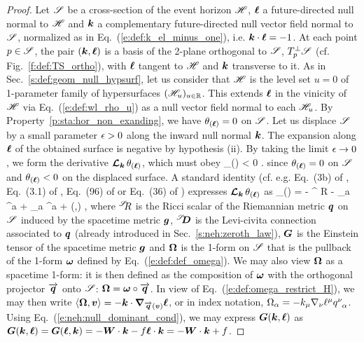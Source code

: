 \begin{proof}
Let $\mathscr{S}$ be a cross-section of the event horizon $\mathscr{H}$,
$\bm{\ell}$ a future-directed null normal to $\mathscr{H}$ and $\bm{k}$ a complementary
future-directed null vector field
normal to $\mathscr{S}$, normalized as in Eq.~(\ref{e:def:k_el_minus_one}), i.e.
$\bm{k}\cdot\bm{\ell} = -1$. At each point $p\in \mathscr{S}$, the pair $(\bm{k},\bm{\ell})$ is
a basis of the 2-plane orthogonal to $\mathscr{S}$, $T_p^\perp\mathscr{S}$ (cf. Fig.~\ref{f:def:TS_ortho}),
with $\bm{\ell}$ tangent to $\mathscr{H}$ and $\bm{k}$ transverse to it.
As in Sec.~\ref{s:def:geom_null_hypsurf}, let us consider that $\mathscr{H}$
is the level set $u=0$ of 1-parameter family of hypersurfaces $(\mathscr{H}_u)_{u\in\mathbb{R}}$.
This extends $\bm{\ell}$ in the vinicity of $\mathscr{H}$ via Eq.~(\ref{e:def:wl_rho_u})
as a null vector field normal to each $\mathscr{H}_u$.
By Property~\ref{p:sta:hor_non_exanding}, we have $\theta_{(\bm{\ell})} = 0$
on $\mathscr{S}$. Let us displace $\mathscr{S}$ by a small parameter $\epsilon>0$ along the inward
null normal $\bm{k}$. The expansion along $\bm{\ell}$ of the obtained surface is
negative by hypothesis (ii). By taking the limit $\epsilon\to 0$, we form the
derivative $\bm{\mathcal{L}}_{\bm{\bm{k}}}\, \theta_{(\bm{\ell})}$, which must obey
\be \label{e:sta:Lie_k_l}
     \theta_{(\wl)} < 0 .
\ee
since $\theta_{(\bm{\ell})} = 0$ on $\mathscr{S}$ and
$\theta_{(\bm{\ell})} < 0$ on the displaced surface.
A standard identity (cf. e.g. Eq.~(3b) of \cite{Haywa94}, Eq.~(3.1) of \cite{BoothF07},
Eq.~(96) of \cite{Cao11} or Eq.~(36) of \cite{Jaram13})
expresses $\bm{\mathcal{L}}_{\bm{\bm{k}}}\,\theta_{(\bm{\ell})}$ as
\be \label{e:sta:Lie_k_theta_l}
     \theta_{(\wl)} = -  {}^\Sp\!\! R - \DSc_a \Omega^a
    +  \Omega_a \Omega^a + (,\wl) ,
\ee
where ${}^{\mathscr{S}}\!\! R$ is the Ricci scalar of the Riemannian metric $\bm{q}$ on
$\mathscr{S}$ induced by the spacetime metric $\bm{g}$, ${}^{\mathscr{S}}\!\!\bm{D}$ is the Levi-civita
connection associated to $\bm{q}$ (already introduced in Sec.~\ref{s:neh:zeroth_law}),
$\bm{G}$ is the Einstein tensor
of the spacetime metric $\bm{g}$ and $\bm{\Omega}$ is the 1-form on $\mathscr{S}$
that is the pullback of the 1-form $\bm{\omega}$ defined by Eq.~(\ref{e:def:def_omega}).
We may also view $\bm{\Omega}$ as a spacetime 1-form: it is then defined as
the composition of $\bm{\omega}$ with the orthogonal projector $\overrightarrow{\bm{q}}$ onto
$\mathscr{S}$: $\bm{\Omega} = \bm{\omega} \circ \overrightarrow{\bm{q}}$.
In view of Eq.~(\ref{e:def:omega_restrict_H}), we may then write
$\langle\bm{\Omega}, \bm{v} \rangle = - \bm{k} \cdot\bm{\nabla}_{\overrightarrow{\bm{q}}(\bm{v})} \bm{\ell}$,
or in index notation, $\Omega_\alpha  = - k_\mu \nabla_\nu \ell^\mu q^\nu_{\ \, \alpha}$.
Using Eq.~(\ref{e:neh:null_dominant_cond}), we may express $\bm{G}(\bm{k},\bm{\ell})$
as $\bm{G}(\bm{k},\bm{\ell}) = \bm{G}(\bm{\ell}, \bm{k}) = - \bm{W}\cdot\bm{k} - f \bm{\ell}\cdot \bm{k} = - \bm{W}\cdot\bm{k} + f$.

\end{proof}
